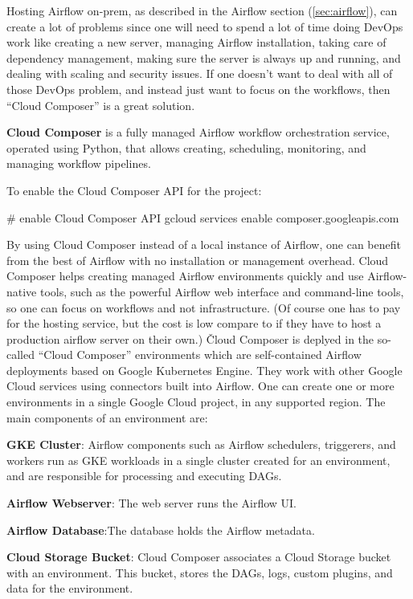 Hosting Airflow on-prem, as described in the Airflow section (\ref{sec:airflow}), can create a lot of problems since one
will need to spend a lot of time doing DevOps work like creating a new server, managing Airflow installation, taking
care of dependency management, making sure the server is always up and running, and dealing with scaling and security
issues. If one doesn't want to deal with all of those DevOps problem, and instead just want to focus on the workflows,
then ``Cloud Composer'' is a great solution.

\textbf{Cloud Composer} is a fully managed Airflow workflow orchestration service, operated using Python, that allows
creating, scheduling, monitoring, and managing workflow pipelines.
\ed

To enable the Cloud Composer API for the project:
\begin{bash}
# enable Cloud Composer API
gcloud services enable composer.googleapis.com
\end{bash}

By using Cloud Composer instead of a local instance of Airflow, one can benefit from the best of Airflow with no
installation or management overhead. Cloud Composer helps creating managed Airflow environments quickly and use
Airflow-native tools, such as the powerful Airflow web interface and command-line tools, so one can focus on
workflows and not infrastructure. (Of course one has to pay for the hosting service, but the cost is low compare to
if they have to host a production airflow server on their own.) \v

Cloud Composer is deplyed in the so-called ``Cloud Composer'' environments which are self-contained Airflow deployments
based on Google Kubernetes Engine. They work with other Google Cloud services using connectors built into Airflow. One
can create one or more environments in a single Google Cloud project, in any supported region. The main components of an
environment are:
\bit
\item \textbf{GKE Cluster}: Airflow components such as Airflow schedulers, triggerers, and workers run as GKE workloads
in a single cluster created for an environment, and are responsible for processing and executing DAGs.
\item \textbf{Airflow Webserver}: The web server runs the Airflow UI\@.
\item \textbf{Airflow Database}:The database holds the Airflow metadata.
\item \textbf{Cloud Storage Bucket}: Cloud Composer associates a Cloud Storage bucket with an environment. This bucket,
stores the DAGs, logs, custom plugins, and data for the environment.
\eit

